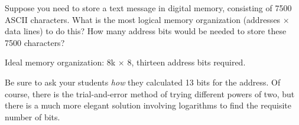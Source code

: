 

Suppose you need to store a text message in digital memory, consisting of 7500 ASCII characters.  What is the most logical memory organization (addresses $\times$ data lines) to do this?  How many address bits would be needed to store these 7500 characters?







Ideal memory organization: 8k $\times$ 8, thirteen address bits required.







Be sure to ask your students {\it how} they calculated 13 bits for the address.  Of course, there is the trial-and-error method of trying different powers of two, but there is a much more elegant solution involving logarithms to find the requisite number of bits.




